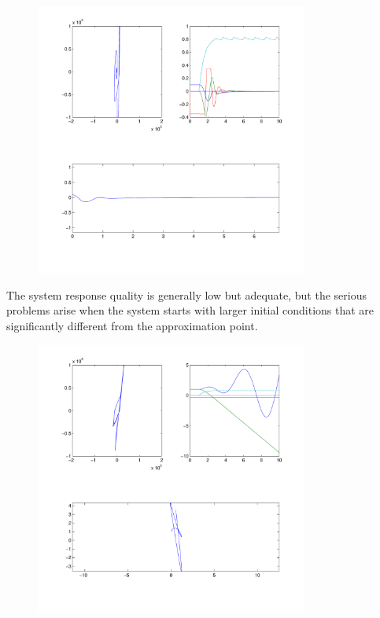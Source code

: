 \begin{figure}[H]
	\centering
	\includegraphics[width=0.8\textwidth]{img2/PI01}
	\caption{}
	\label{}
\end{figure}

The system response quality is generally low but adequate, but the serious problems arise when the system starts with larger initial conditions that are significantly different from the approximation point.

\begin{figure}[H]
	\centering
	\includegraphics[width=0.8\textwidth]{img2/PI11}
	\caption{}
	\label{}
\end{figure}

